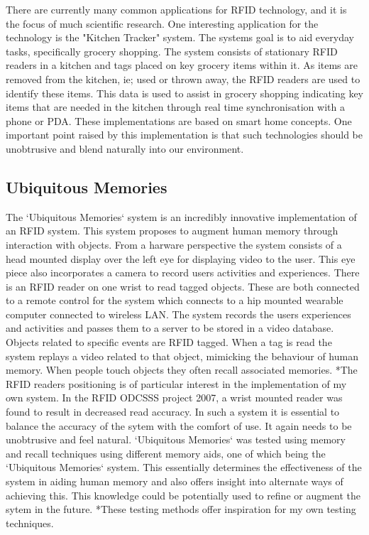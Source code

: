 \documentclass[]{final_report}
\begin{document}
There are currently many common applications for RFID technology, and it is the focus of much scientific research. One interesting application for the technology is the \cite{ece}"Kitchen Tracker" system. The systems goal is to aid everyday tasks, specifically grocery shopping. The system consists of stationary RFID readers in a kitchen and tags placed on key grocery items within it. As items are removed from the kitchen, ie; used or thrown away, the RFID readers are used to identify these items. This data is used to assist in grocery shopping indicating key items that are needed in the kitchen through real time synchronisation with a phone or PDA. These implementations are based on \cite{smart}smart home concepts. One important point raised by this implementation is that such technologies should be unobtrusive and blend naturally into our environment.


\subsection {Ubiquitous Memories}

The \cite{ubi}`Ubiquitous Memories` system is an incredibly innovative implementation of an RFID system. This system proposes to\cite{ubi} augment human memory through interaction with objects. From a harware perspective the system consists of a head mounted display over the left eye for displaying video to the user. This eye piece also incorporates a camera to record users activities and experiences. There is an RFID reader on one wrist to read tagged objects. These are both connected to a remote control for the system which connects to a hip mounted wearable computer connected to wireless LAN. The system records the users experiences and activities and passes them to a server to be stored in a video database. Objects related to specific events are RFID tagged. When a tag is read the system replays a video related to that object, mimicking the behaviour of human memory. When people touch objects they often recall associated memories. *The RFID readers positioning is of particular interest in the implementation of my own system. In the \cite{cait}RFID ODCSSS project 2007, a wrist mounted reader was found to result in decreased read accuracy. In such a system it is essential to balance the accuracy of the sytem with the comfort of use. It again needs to be unobtrusive and feel natural. \cite{ubi}`Ubiquitous Memories` was tested using memory and recall techniques using different memory aids, one of which being the `Ubiquitous Memories` system. This essentially determines the effectiveness of the system in aiding human memory and also offers insight into alternate ways of achieving this. This knowledge could be potentially used to refine or augment the sytem in the future. *These testing methods offer inspiration for my own testing techniques.
\end{document}

